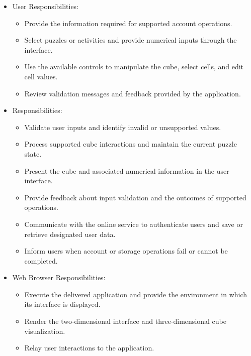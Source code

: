 \documentclass[12pt]{article}
\begin{document}

\begin{itemize}
\item User Responsibilities:
\begin{itemize}
\item Provide the information required for supported account
  operations.
\item Select puzzles or activities and provide numerical
  inputs through the interface.
\item Use the available controls to manipulate the cube, select
  cells, and edit cell values.
\item Review validation messages and feedback provided by
  the application.
\end{itemize}
\item \progname{} Responsibilities:
\begin{itemize}
\item Validate user inputs and identify invalid or
  unsupported values.
\item Process supported cube interactions and maintain
  the current puzzle state.
\item Present the cube and associated numerical information
  in the user interface.
\item Provide feedback about input validation and the
  outcomes of supported operations.
\item Communicate with the online service to authenticate
  users and save or retrieve designated user data.
\item Inform users when account or storage operations fail
  or cannot be completed.
\end{itemize}
\item Web Browser Responsibilities:
\begin{itemize}
\item Execute the delivered application and provide the
  environment in which its interface is displayed.
\item Render the two-dimensional interface and
  three-dimensional cube visualization.
\item Relay user interactions to the application.
\end{itemize}
\end{itemize}
\end{document}
